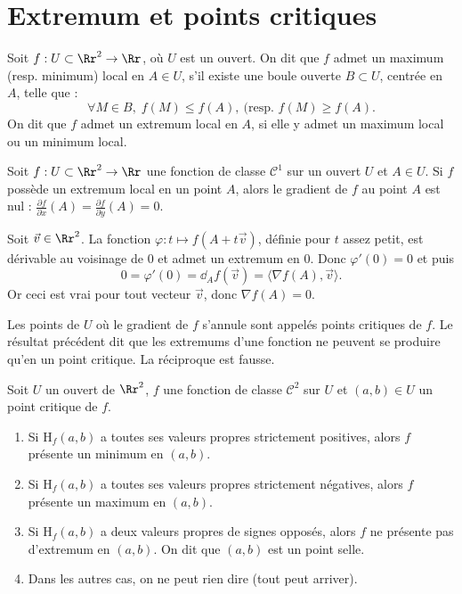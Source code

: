 \documentclass[12pt, class=report,crop=false]{standalone}
\begin{document}
{\section{Extremum et points critiques}

\vskip4mm

\begin{definition}Soit $f:U\subset \Rr^2\to \Rr$, o\`u $U$ est un ouvert. On dit que $f$ admet un maximum (resp. minimum) local en $A\in U$, s'il existe une boule ouverte $B\subset U$, centrée en $A$, telle que :
$$\forall M\in B,\; f(M) \leq f(A),\: (\mbox{resp. }f(M)\geq f(A).$$
On dit que $f$ admet un extremum local en $A$, si elle y admet un maximum local ou un minimum local.
\end{definition}

\vskip4mm

\begin{proposition}Soit $f:U\subset \Rr^2\to \Rr$ une fonction de classe $\mathscr{C}^1$ sur un ouvert $U$ et $A\in U$. Si $f$ possède un extremum local en un point $A$, alors le gradient de $f$ au point $A$ est nul : $\displaystyle \frac{\partial f}{\partial x}(A)=\frac{\partial f}{\partial y}(A)=0$.
\end{proposition}

\vskip2mm

Soit $\vec{v}\in \Rr^2$. La fonction $\varphi :t\mapsto f(A+t\vec{v})$, définie pour $t$ assez petit, est dérivable au voisinage de $0$ et admet un extremum en $0$. Donc $\varphi '(0)=0$ et puis
$$0=\varphi '(0)=\dd_Af(\vec{v})=\langle \nabla f(A),\vec{v}\rangle.$$
Or ceci est vrai pour tout vecteur $\vec{v}$, donc $\nabla f(A)=0$.

\vskip6mm

\noindent Les points de $U$ o\`u le gradient de $f$ s'annule sont appelés points critiques de $f$. Le résultat précédent dit que les extremums d'une fonction ne peuvent se produire qu'en un point critique. La réciproque est fausse.

\vskip6mm

\begin{theoreme}Soit $U$ un ouvert de $\Rr^2$, $f$ une fonction de classe $\mathscr{C}^2$ sur $U$ et $(a,b)\in U$ un point critique de $f$.
\begin{enumerate}
\item Si $\mathrm{H}_f(a,b)$ a toutes ses valeurs propres strictement positives, alors $f$ présente un minimum en $(a,b)$.
\item Si $\mathrm{H}_f(a,b)$ a toutes ses valeurs propres strictement négatives, alors $f$ présente un maximum en $(a,b)$.
\item Si $\mathrm{H}_f(a,b)$ a deux valeurs propres de signes opposés, alors $f$ ne présente pas d'extremum en $(a,b)$. On dit que $(a,b)$ est un point selle.
\item Dans les autres cas, on ne peut rien dire (tout peut arriver).
\end{enumerate}
\end{theoreme}

}
\end{document}
